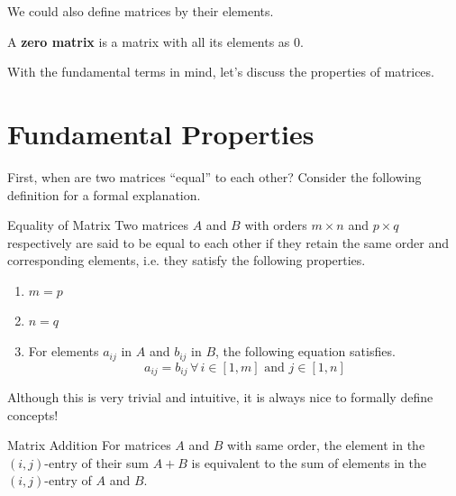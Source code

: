 \documentclass[../main.tex]{subfiles}
\begin{document}
We could also define matrices by their elements.

\begin{definition}
A \textbf{zero matrix} is a matrix with all its elements as $0$.
\end{definition}

With the fundamental terms in mind, let's discuss the properties
of matrices.

\section{Fundamental Properties}

First, when are two matrices ``equal'' to each other? Consider
the following definition for a formal explanation.

\begin{theorem}{Equality of Matrix}
Two matrices $A$ and $B$ with orders $m \times n$ and $p \times q$
respectively are said to be equal to each other if they retain
the same order and corresponding elements, i.e. they satisfy the
following properties.
\begin{enumerate}
\item $m = p$
\item $n = q$
\item
For elements $a_{ij}$ in $A$ and $b_{ij}$ in $B$, the following
equation satisfies.
\[
a_{ij} = b_{ij} \,
    \forall \, i \in [1, m] \text{ and } j \in [1, n]
\]
\end{enumerate}
\end{theorem}

Although this is very trivial and intuitive, it is always nice
to formally define concepts!

\begin{theorem}{Matrix Addition}
For matrices $A$ and $B$ with same order, the element in the
$(i, j)$-entry of their sum $A + B$ is equivalent to the sum of
elements in the $(i, j)$-entry of $A$ and $B$.
\end{theorem}
\end{document}
